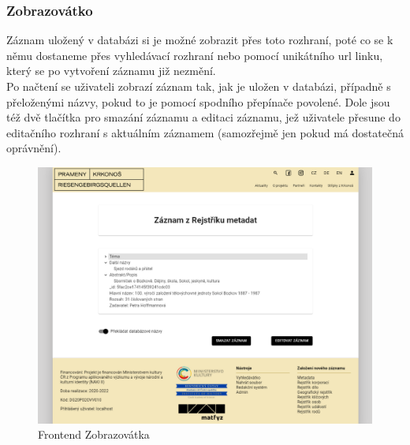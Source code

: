 \subsubsection{Zobrazovátko}
Záznam uložený v databázi si je možné zobrazit přes toto rozhraní, poté co
se k němu dostaneme přes vyhledávací rozhraní nebo pomocí unikátního
url linku, který se po vytvoření záznamu již nezmění.
\\
Po načtení se uživateli zobrazí záznam tak, jak je uložen v databázi, případně
s přeloženými názvy, pokud to je pomocí spodního přepínače povolené.
Dole jsou též dvě tlačítka pro smazání záznamu a editaci záznamu, jež uživatele
přesune do editačního rozhraní s aktuálním záznamem (samozřejmě jen pokud 
má dostatečná oprávnění).
\begin{figure}[H]
	\centering
	\includegraphics[width=.8\linewidth]{img/showScene.png}
	\caption{Frontend Zobrazovátka}
\end{figure}


